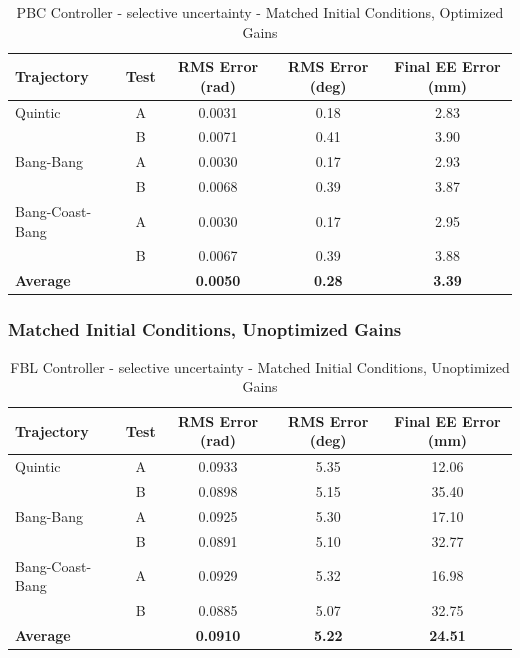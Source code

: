 \documentclass[11pt,a4paper]{article}
\begin{document}
\begin{table}[H]
\centering
\caption{PBC Controller - selective uncertainty - Matched Initial Conditions, Optimized Gains}
\begin{tabular}{lcccc}
\toprule
Trajectory & Test & RMS Error (rad) & RMS Error (deg) & Final EE Error (mm) \\
\midrule
Quintic & A & 0.0031 & 0.18 & 2.83 \\
 & B & 0.0071 & 0.41 & 3.90 \\
\midrule
Bang-Bang & A & 0.0030 & 0.17 & 2.93 \\
 & B & 0.0068 & 0.39 & 3.87 \\
\midrule
Bang-Coast-Bang & A & 0.0030 & 0.17 & 2.95 \\
 & B & 0.0067 & 0.39 & 3.88 \\
\midrule
\textbf{Average} & & \textbf{0.0050} & \textbf{0.28} & \textbf{3.39} \\
\bottomrule
\end{tabular}
\end{table}

\subsubsection{Matched Initial Conditions, Unoptimized Gains}

\begin{table}[H]
\centering
\caption{FBL Controller - selective uncertainty - Matched Initial Conditions, Unoptimized Gains}
\begin{tabular}{lcccc}
\toprule
Trajectory & Test & RMS Error (rad) & RMS Error (deg) & Final EE Error (mm) \\
\midrule
Quintic & A & 0.0933 & 5.35 & 12.06 \\
 & B & 0.0898 & 5.15 & 35.40 \\
\midrule
Bang-Bang & A & 0.0925 & 5.30 & 17.10 \\
 & B & 0.0891 & 5.10 & 32.77 \\
\midrule
Bang-Coast-Bang & A & 0.0929 & 5.32 & 16.98 \\
 & B & 0.0885 & 5.07 & 32.75 \\
\midrule
\textbf{Average} & & \textbf{0.0910} & \textbf{5.22} & \textbf{24.51} \\
\bottomrule
\end{tabular}
\end{table}
\end{document}
